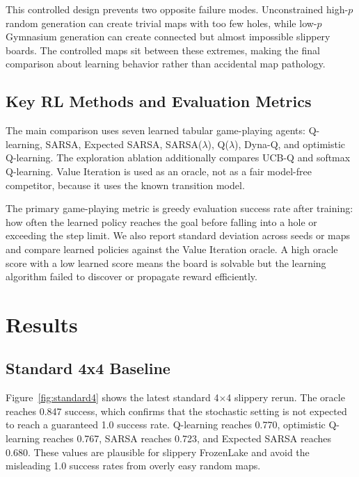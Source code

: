 \documentclass[10pt]{article}
\begin{document}
This controlled design prevents two opposite failure modes. Unconstrained high-$p$ random generation can create trivial maps with too few holes, while low-$p$ Gymnasium generation can create connected but almost impossible slippery boards. The controlled maps sit between these extremes, making the final comparison about learning behavior rather than accidental map pathology.

\subsection{Key RL Methods and Evaluation Metrics}
The main comparison uses seven learned tabular game-playing agents: Q-learning, SARSA, Expected SARSA, SARSA($\lambda$), Q($\lambda$), Dyna-Q, and optimistic Q-learning. The exploration ablation additionally compares UCB-Q and softmax Q-learning. Value Iteration is used as an oracle, not as a fair model-free competitor, because it uses the known transition model.

The primary game-playing metric is greedy evaluation success rate after training: how often the learned policy reaches the goal before falling into a hole or exceeding the step limit. We also report standard deviation across seeds or maps and compare learned policies against the Value Iteration oracle. A high oracle score with a low learned score means the board is solvable but the learning algorithm failed to discover or propagate reward efficiently.

\section{Results}
\subsection{Standard 4x4 Baseline}
Figure~\ref{fig:standard4} shows the latest standard 4$\times$4 slippery rerun. The oracle reaches 0.847 success, which confirms that the stochastic setting is not expected to reach a guaranteed 1.0 success rate. Q-learning reaches 0.770, optimistic Q-learning reaches 0.767, SARSA reaches 0.723, and Expected SARSA reaches 0.680. These values are plausible for slippery FrozenLake and avoid the misleading 1.0 success rates from overly easy random maps.
\end{document}
